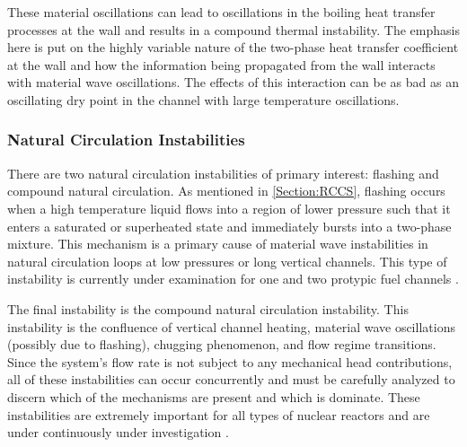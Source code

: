 These material oscillations can lead to oscillations in the boiling heat transfer processes at the wall and results in a compound thermal instability.
The emphasis here is put on the highly variable nature of the two-phase heat transfer coefficient at the wall and how the information being propagated from the wall interacts with material wave oscillations.
The effects of this interaction can be as bad as an oscillating dry point in the channel with large temperature oscillations.



\subsubsection{Natural Circulation Instabilities}
There are two natural circulation instabilities of primary interest: flashing and compound natural circulation.
As mentioned in \cref{Section:RCCS}, flashing occurs when a high temperature liquid flows into a region of lower pressure such that it enters a saturated or superheated state and immediately bursts into a two-phase mixture.
This mechanism is a primary cause of material wave instabilities in natural circulation loops at low pressures or long vertical channels.
This type of instability is currently under examination for one and two protypic fuel channels \cite{marcel_experimental_2009,marcel_experimental_2010}.

The final instability is the compound natural circulation instability.
This instability is the confluence of vertical channel heating, material wave oscillations (possibly due to flashing), chugging phenomenon, and flow regime transitions.
Since the system's flow rate is not subject to any mechanical head contributions, all of these instabilities can occur concurrently and must be carefully analyzed to discern which of the mechanisms are present and which is dominate.
These instabilities are extremely important for all types of nuclear reactors and are under continuously under investigation \cite{dauria_characterization_1990,aritomi_fundamental_1992,yun_two-phase_2005}.

